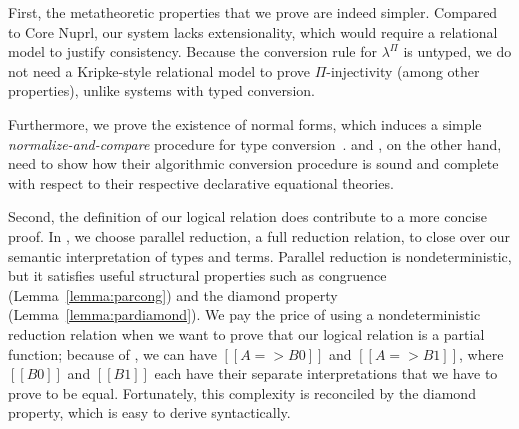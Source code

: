 \documentclass[\ifpublic nolinenum\else\fi,online,OA]{jfp}
\newcommand{\scw}[1]{}
\newcommand{\yl}[1]{}
\newcommand{\jc}[1]{}
\newcommand{\lang}{$\lambda^{\Pi}$\xspace}
\theoremstyle{definition}
\begin{document}
First, the metatheoretic properties that we prove are indeed
simpler. Compared to Core Nuprl, our system
lacks extensionality, which would require a relational model to
justify consistency. Because the conversion rule for
\lang{} is untyped, we do not
need a Kripke-style relational model to prove $\Pi$-injectivity
(among other properties), unlike systems with typed conversion.
\jc{Why do we need Pi-injectivity? Why would a Kripke-style model be required
to prove it for typed conversion? What is a Kripke-style model?}
Furthermore, we prove the existence of normal
forms, which induces a simple \emph{normalize-and-compare}
procedure for type
conversion~\cite{pierce2004advanced}.  and \citet{decagda}, on
the other hand, need
to show how their algorithmic conversion procedure is sound and complete
with respect to their respective declarative equational theories.
\scw{I'm getting confused by this paragraph. Does this reorganization sense:
  Our language is simpler than Nuprl, because it doesn't have extensional
  equality. It is simpler than Agda, because it doesn't have type-directed
  equality. Both of these cases require the definition of a binary logical
  relation, that defines a notion of semantic equality between terms. This
  relation justifies the injectivity of $\Pi$ types and justify the validity
  of $\eta$-conversion among other properties.}  \scw{Furthermore our proof is
  also simpler because we don't need prove the correctness of the NBE
  algorithm, which is used to show the decidability of Agda's type-directed
  equivalence. Therefore, we don't need to define this algorithm and show that
  it is sound and complete with respect to the type-directed
  equality. Instead, to show the decidability of our untyped equivalence, we
  need only show that terms have $\beta\eta$ normal forms. }
\yl{Makes sense. Though Abel's work doesn't use nbe but a recursive
  binary algorithm. Rewrote the paragraph above and commented out the original}

Second, the definition of our logical relation does
contribute to a more concise proof.
In , we choose parallel reduction, a full
reduction relation, to close over our semantic interpretation of types
and terms. Parallel reduction is nondeterministic, but it satisfies
useful structural properties such as congruence
(Lemma~\ref{lemma:parcong}) and the diamond property
(Lemma~\ref{lemma:pardiamond}). We pay the price of using a
nondeterministic reduction relation when we want to prove that our
logical relation is a partial function; because of , we
can have $[[A => B0]]$ and $[[A => B1]]$, where $[[B0]]$ and $[[B1]]$
each have their separate interpretations that we have to prove to be
equal. Fortunately, this complexity is reconciled by the
diamond property, which is easy to derive syntactically.
\end{document}
